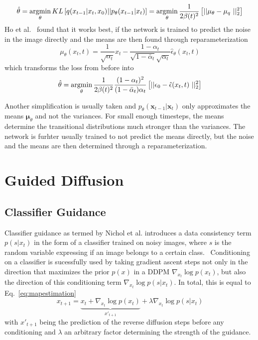 \begin{equation}
    \hat{\theta} = \argmin_{\theta} KL \left[ q(x_{t-1}|x_{t},x_0) || p_{\theta}(x_{t-1}|x_{t}) \right] = \argmin_{\theta} \frac{1}{2\beta(t)^2} \left[ || \mu_{\theta} - \mu_{q} ||_2^2 \right]
\end{equation}
Ho et al.~\autocite{ho2020denoising} found that it works best, if the network is trained to predict the noise in the image directly and the means are then found through reparameterization
\begin{equation}
    \mu_{\theta}(x_t,t) = \frac{1}{\sqrt{\alpha_t}}x_t - \frac{1-\alpha_t}{\sqrt{1-\bar{\alpha}_t}\sqrt{\alpha_t}}\hat{\epsilon}_{\theta}(x_t,t)
\end{equation}
which transforms the loss from before into
\begin{equation}
    \hat{\theta} = \argmin_{\theta}\frac{1}{2\beta(t)^2} \frac{(1-\alpha_t)^2}{(1-\bar{\alpha}_t)\alpha_t} \left[ || \epsilon_0 - \hat{\epsilon}(x_t, t)  ||_2^2 \right]
\end{equation}


Another simplification is usually taken and $p_{\theta}(\bm{x}_{t-1} | \bm{x}_t)$ only approximates the means $\bm{\mu}_{\theta}$ and not the variances. For small enough timesteps, the means determine the transitional distributions much stronger than the variances. The network is furhter usually trained to not predict the means directly, but the noise and the means are then determined through a reparameterization.~\autocite{ho2020denoising,nichol2021improved}

\section{Guided Diffusion}
\subsection{Classifier Guidance}
Classifier guidance as termed by Nichol et al. introduces a data consistency term $p(s|x_t)$ in the form of a classifier trained on noisy images, where $s$ is the random variable expressing if an image belongs to a certain class.~\autocite{dhariwal2021diffusion,sohldickstein2015deep} Conditioning on a classifier is sucessfully used by taking gradient ascent steps not only in the direction that maximizes the prior $p(x)$ in a DDPM $\nabla_{x_t} \log p(x_t)$, but also the direction of this conditioning term $\nabla_{x_t} \log p(s|x_t)$. In total, this is equal to Eq.~\ref{eq:mapestimation}
\begin{equation}
    x_{t+1} = \underbrace{x_{t} + \nabla_{x_t} \log p(x_t)}_{x'_{t+1}} + \lambda \nabla_{x_t} \log p(s|x_t)
\end{equation}
with $x'_{t+1}$ being the prediction of the reverse diffusion steps before any conditioning and $\lambda$ an arbitrary factor determining the strength of the guidance.

